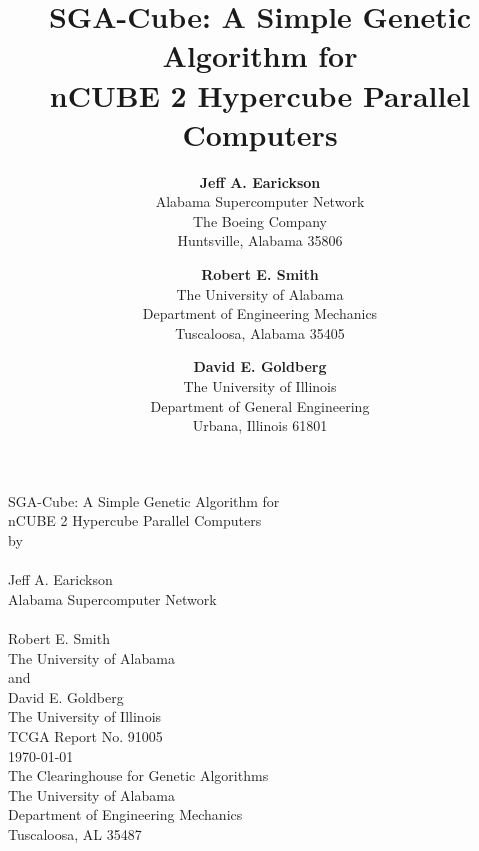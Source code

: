 \pagestyle{empty}
\oddsidemargin=0in
\evensidemargin=0in
\topmargin=0.5in
\textheight=9in
\textwidth=6.5in 
\footheight=0in
\columnsep=0.25in
\headsep=0in
\headheight=0in


\def\btt#1{\bf{\tt #1}}




\begin{titlepage}
\begin{center}
\vspace*{2.35in}
SGA-Cube: A Simple Genetic Algorithm for  \\
nCUBE 2 Hypercube Parallel Computers
\ \\
by\\
\ \\
Jeff A. Earickson\\
Alabama Supercomputer Network\\
\ \\
Robert E. Smith\\
The University of Alabama\\
and\\
David E. Goldberg\\
The University of Illinois\\
\vspace{0.7in}
TCGA Report No. 91005\\
\today \\
\vspace{2.2in}
The Clearinghouse for Genetic Algorithms\\
The University of Alabama\\
Department of Engineering Mechanics\\
Tuscaloosa, AL 35487
\end{center}
\end{titlepage}

\title{SGA-Cube: A Simple Genetic Algorithm for  \\
nCUBE 2 Hypercube Parallel Computers}
\author{ {\bf Jeff A. Earickson}\\
Alabama Supercomputer Network\\
The Boeing Company\\
Huntsville, Alabama 35806
\and {\bf Robert E. Smith}\\
The University of Alabama\\
Department of Engineering Mechanics\\
Tuscaloosa, Alabama 35405 
\and {\bf David E. Goldberg}\\
The University of Illinois\\
Department of General Engineering\\
Urbana, Illinois 61801
}

